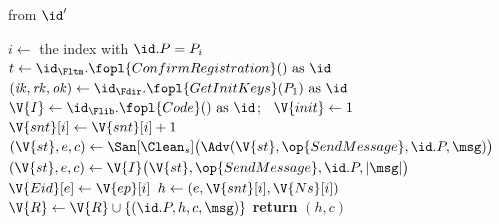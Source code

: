 \begin{interface}
{ \quad from $\id'$
\begin{algorithmic}[1]
\algcont
{} \label{ln:smtwo}
\State $i \gets$ the index with $\id.P = P_i$
   \label{ln:sminitiator}
  \State $t \gets \id_{\Fltm}.\fopl{ConfirmRegistration}() \text{ as } \id$
   \label{ln:smltm}
  \State $(\mathit{ik}, \mathit{rk}, \mathit{ok}) \gets \id_{\Fdir}.\fopl{GetInitKeys}(P_1) \text{ as } \id$
   \label{ln:smprekey}
  \State $\V{I} \gets \id_{\Flib}.\fopl{Code}() \text{ as } \id$; \ $\V{init} \gets 1$
\EndIf
\State $\V{snt}[i] \gets \V{snt}[i] + 1$
 \label{ln:smcompromised}
  \State $(\V{st}, e, c) \gets \San[\Clean_{s}]\bigl(\Adv(\V{st}, \op{SendMessage}, \id.P, \msg)\bigr)$ \label{ln:smplaintext}
\EndIf
{}
  \State $(\V{st}, e, c) \gets \V{I}\bigl(\V{st}, \op{SendMessage}, \id.P, |\msg|\bigr)$ \label{ln:smlength}
\EndIf
{}
   \label{ln:smfreshepoch}
  \State $\V{Eid}[e] \gets \V{ep}[i]$
\EndIf
\State $h \gets (e, \V{snt}[i], \V{Ns}[i])$ \label{ln:smheader}
 \label{ln:smrecord}
  \State $\V{R} \gets \V{R} \cup \{(\id.P, h, c, \msg)\}$
\EndIf
\State \textbf{return} $(h, c)$
\algsave
\end{algorithmic}
\vspace{1.4ex}

}
\end{interface}
